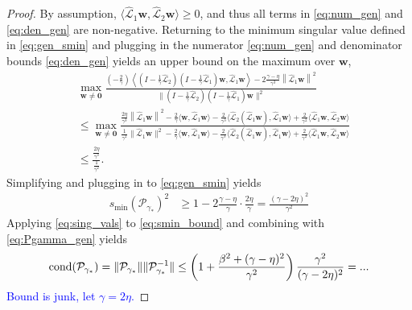 \documentclass[a4paper,10pt]{article}
\newcommand{\tcb}{\textcolor{blue}}
\begin{document}
\begin{proof}
By assumption, $\langle\widehat{\mathcal{L}}_1\mathbf{w},\widehat{\mathcal{L}}_2\mathbf{w}\rangle\geq 0$,
and thus all terms in \eqref{eq:num_gen} and \eqref{eq:den_gen} are non-negative.
Returning to the minimum singular value defined in \eqref{eq:gen_smin} and plugging in
the numerator \eqref{eq:num_gen} and denominator bounds \eqref{eq:den_gen} yields
an upper bound on the maximum over $\mathbf{w}$,
%
{\small
\begin{align}\label{eq:max_bound0}
&\max_{\mathbf{w}\neq\mathbf{0}}
	\frac{(-\tfrac{2}{\gamma})\left\langle(I - \tfrac{1}{\gamma}\widehat{\mathcal{L}}_2)(I -
		\tfrac{1}{\gamma}\widehat{\mathcal{L}}_1)\mathbf{w},
		\widehat{\mathcal{L}}_1\mathbf{w} \right\rangle- 
		2\frac{\gamma-\eta}{\gamma^3}\left\|\widehat{\mathcal{L}}_1\mathbf{w} \right\|^2}
	{\|(I - \tfrac{1}{\gamma}\widehat{\mathcal{L}}_2)(I - \tfrac{1}{\gamma}\widehat{\mathcal{L}}_1)\mathbf{w}\|^2} \\
& \leq \max_{\mathbf{w}\neq\mathbf{0}}
	\frac{\frac{2\eta}{\gamma^3}
			\left\|\widehat{\mathcal{L}}_1\mathbf{w} \right\|^2
		- \frac{2}{\gamma}\langle\mathbf{w},\widehat{\mathcal{L}}_1\mathbf{w}\rangle
		- \frac{2}{\gamma^3}\langle\widehat{\mathcal{L}}_2(\widehat{\mathcal{L}}_1\mathbf{w}),\widehat{\mathcal{L}}_1\mathbf{w}\rangle
		+ \frac{2}{\gamma^2}\langle\widehat{\mathcal{L}}_1\mathbf{w},\widehat{\mathcal{L}}_2\mathbf{w}\rangle}
	{\frac{1}{\gamma^2}\|\widehat{\mathcal{L}}_1\mathbf{w}\|^2
	- \frac{2}{\gamma}\langle \mathbf{w}, \widehat{\mathcal{L}}_1\mathbf{w}\rangle 
	- \frac{2}{\gamma^3}\langle \widehat{\mathcal{L}}_2(\widehat{\mathcal{L}}_1\mathbf{w}),
		\widehat{\mathcal{L}}_1\mathbf{w}\rangle
	+ \frac{2}{\gamma^2}\langle\widehat{\mathcal{L}}_1\mathbf{w},\widehat{\mathcal{L}}_2\mathbf{w}\rangle} \nonumber\\
& \leq \frac{\frac{2\eta}{\gamma^3}}{\frac{1}{\gamma^2}}.\label{eq:max_bound}
\end{align}
}
%
Simplifying and plugging in to \eqref{eq:gen_smin} yields
%
\begin{align}\label{eq:smin_bound}
s_{\min}(\mathcal{P}_{\gamma_*})^2 &\geq 1 - 2\frac{\gamma-\eta}{\gamma} \cdot
	\frac{2\eta}{\gamma}
= \frac{(\gamma-2\eta)^2}{\gamma^2}
\end{align}
%
Applying \eqref{eq:sing_vals} to \eqref{eq:smin_bound} and
combining with \eqref{eq:Pgamma_gen} yields
%
\begin{align}
\textnormal{cond}(\mathcal{P}_{\gamma_*}) =
	\|\mathcal{P}_{\gamma_*}\|\|\mathcal{P}_{\gamma_*}^{-1}\|
	\leq \left(1 + \frac{\beta^2 + (\gamma-\eta)^2}{\gamma^2}\right)
		\frac{\gamma^2}{(\gamma-2\eta)^2}
	= ...
\end{align}
%
\tcb{Bound is junk, let $\gamma = 2\eta$.}
\end{proof}
%
\end{document}

